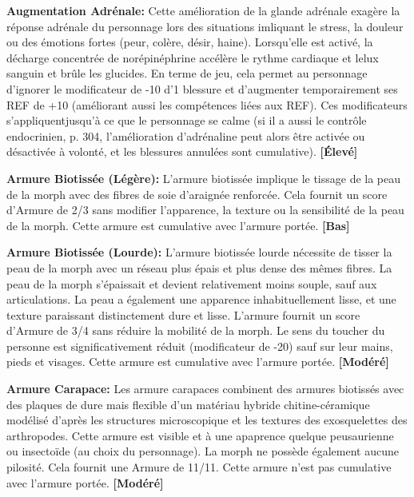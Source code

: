 \textbf{Augmentation Adrénale:} Cette amélioration de la glande adrénale exagère la réponse adrénale du personnage lors des situations imliquant le stress, la douleur ou des émotions fortes (peur, colère, désir, haine). Lorsqu'elle est activé, la décharge concentrée de norépinéphrine accélère le rythme cardiaque et lelux sanguin et brûle les glucides. En terme de jeu, cela permet au personnage d'ignorer le modificateur de -10 d'1 blessure et d'augmenter temporairement ses REF de +10 (améliorant aussi les compétences liées aux REF). Ces modificateurs s'appliquentjusqu'à ce que le personnage se calme (si il a aussi le contrôle endocrinien, p. 304, l'amélioration d'adrénaline peut alors être activée ou désactivée à volonté, et les blessures annulées sont cumulative). \textbf{[Élevé]} 

\textbf{Armure Biotissée (Légère):} L'armure biotissée implique le tissage de la peau de la morph avec des fibres de soie d'araignée renforcée. Cela fournit un score d'Armure de 2/3 sans modifier l'apparence, la texture ou la sensibilité de la peau de la morph. Cette armure est cumulative avec l'armure portée. \textbf{[Bas]} 

\textbf{Armure Biotissée (Lourde):} L'armure biotissée lourde nécessite de tisser la peau de la morph avec un réseau plus épais et plus dense des mêmes fibres. La peau de la morph s'épaissait et devient relativement moins souple, sauf aux articulations. La peau a également une apparence inhabituellement lisse, et une texture paraissant distinctement dure et lisse. L'armure fournit un score d'Armure de 3/4 sans réduire la mobilité de la morph. Le sens du toucher du personne est significativement réduit (modificateur de -20) sauf sur leur mains, pieds et visages. Cette armure est cumulative avec l'armure portée. \textbf{[Modéré]} 

\textbf{Armure Carapace:} Les armure carapaces combinent des armures biotissés avec des plaques de dure mais flexible d'un matériau hybride chitine-céramique modélisé d'après les structures microscopique et les textures des exosquelettes des arthropodes. Cette armure est visible et à une apaprence quelque peusaurienne ou insectoïde (au choix du personnage). La morph ne possède également aucune pilosité. Cela fournit une Armure de 11/11. Cette armure n'est pas cumulative avec l'armure portée. \textbf{[Modéré]} 

